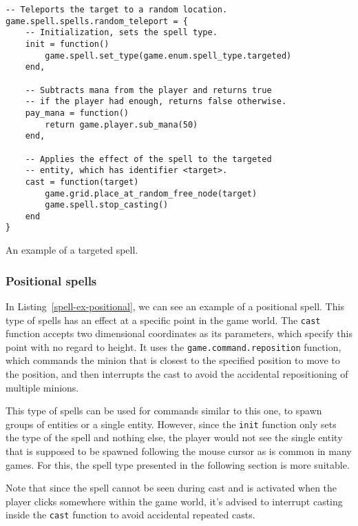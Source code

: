 \begin{listing}[H]
    \centering
    \begin{lstlisting}
-- Teleports the target to a random location.
game.spell.spells.random_teleport = {
    -- Initialization, sets the spell type.
    init = function()
        game.spell.set_type(game.enum.spell_type.targeted)
    end,

    -- Subtracts mana from the player and returns true
    -- if the player had enough, returns false otherwise.
    pay_mana = function()
        return game.player.sub_mana(50)
    end,

    -- Applies the effect of the spell to the targeted
    -- entity, which has identifier <target>.
    cast = function(target)
        game.grid.place_at_random_free_node(target)
        game.spell.stop_casting()
    end
}
    \end{lstlisting}
    \caption{An example of a targeted spell.}
    \label{spell-ex-targeted}
\end{listing}

\subsubsection{Positional spells}

In Listing~\ref{spell-ex-positional}, we can see an example of a positional spell. This type of spells has an effect at a specific point in
the game world. The \texttt{cast} function accepts two dimensional coordinates as its parameters, which specify this point with no regard
to height. It uses the \texttt{game.command.reposition} function, which commands the minion that is closest to the specified position to
move to the position, and then interrupts the cast to avoid the accidental repositioning of multiple minions.

This type of spells can be used for commands similar to this one, to spawn groups of entities or a single entity. However, since the
\texttt{init} function only sets the type of the spell and nothing else, the player would not see the single entity that is supposed
to be spawned following the mouse cursor as is common in many games. For this, the spell type presented in the following section is
more suitable.

Note that since the spell cannot be seen during cast and is activated when the player clicks somewhere within the game world, it's advised
to interrupt casting inside the \texttt{cast} function to avoid accidental repeated casts.

